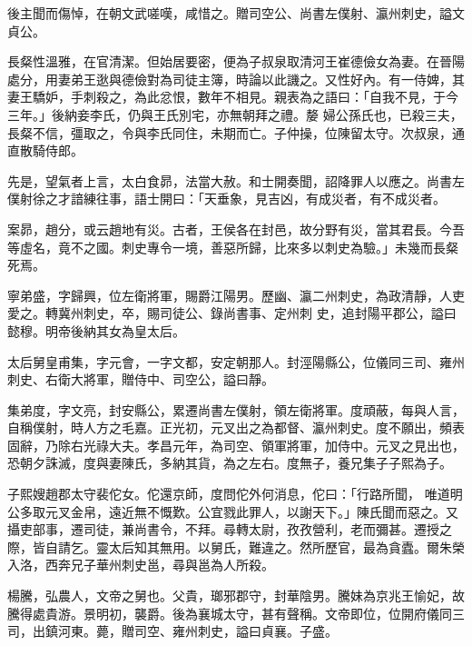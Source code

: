 \begin{pinyinscope}
 後主聞而傷悼，在朝文武嗟嘆，咸惜之。贈司空公、尚書左僕射、瀛州刺史，謚文貞公。



 長粲性溫雅，在官清潔。但始居要密，便為子叔泉取清河王崔德儉女為妻。在晉陽處分，用妻弟王逖與德儉對為司徒主簿，時論以此譏之。又性好內。有一侍婢，其妻王驕妒，手刺殺之，為此忿恨，數年不相見。親表為之語曰：「自我不見，于今三年。」後納妾李氏，仍與王氏別宅，亦無朝拜之禮。嫠
 婦公孫氏也，已殺三夫，長粲不信，彊取之，令與李氏同住，未期而亡。子仲操，位陳留太守。次叔泉，通直散騎侍郎。



 先是，望氣者上言，太白食昴，法當大赦。和士開奏聞，詔降罪人以應之。尚書左僕射徐之才諳練往事，語士開曰：「天垂象，見吉凶，有成災者，有不成災者。



 案昴，趙分，或云趙地有災。古者，王侯各在封邑，故分野有災，當其君長。今吾等虛名，竟不之國。刺史專令一境，善惡所歸，比來多以刺史為驗。」未幾而長粲死焉。



 寧弟盛，字歸興，位左衛將軍，賜爵江陽男。歷幽、瀛二州刺史，為政清靜，人吏愛之。轉冀州刺史，卒，賜司徒公、錄尚書事、定州刺
 史，追封陽平郡公，謚曰懿穆。明帝後納其女為皇太后。



 太后舅皇甫集，字元會，一字文都，安定朝那人。封涇陽縣公，位儀同三司、雍州刺史、右衛大將軍，贈侍中、司空公，謚曰靜。



 集弟度，字文亮，封安縣公，累遷尚書左僕射，領左衛將軍。度頑蔽，每與人言，自稱僕射，時人方之毛嘉。正光初，元叉出之為都督、瀛州刺史。度不願出，頻表固辭，乃除右光祿大夫。孝昌元年，為司空、領軍將軍，加侍中。元叉之見出也，恐朝夕誅滅，度與妻陳氏，多納其貨，為之左右。度無子，養兄集子子熙為子。



 子熙嫂趙郡太守裴佗女。佗還京師，度問佗外何消息，佗曰：「行路所聞，
 唯道明公多取元叉金帛，遠近無不慨歎。公宜戮此罪人，以謝天下。」陳氏聞而惡之。又攝吏部事，遷司徒，兼尚書令，不拜。尋轉太尉，孜孜營利，老而彌甚。遷授之際，皆自請乞。靈太后知其無用。以舅氏，難違之。然所歷官，最為貪蠹。爾朱榮入洛，西奔兄子華州刺史邕，尋與邕為人所殺。



 楊騰，弘農人，文帝之舅也。父貴，瑯邪郡守，封華陰男。騰妹為京兆王愉妃，故騰得處貴游。景明初，襲爵。後為襄城太守，甚有聲稱。文帝即位，位開府儀同三司，出鎮河東。薨，贈司空、雍州刺史，謚曰貞襄。子盛。




\end{pinyinscope}
